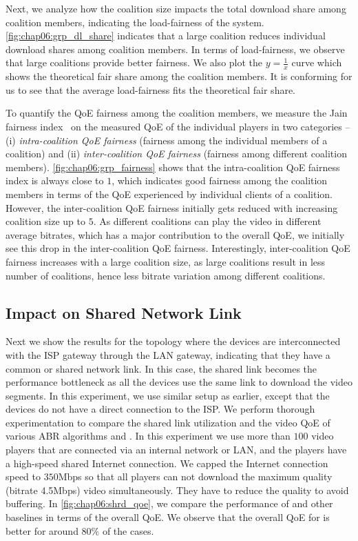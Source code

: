 Next, we analyze how the coalition size impacts the total download share among coalition members, indicating the load-fairness of the system. \fig\ref{fig:chap06:grp_dl_share} indicates that a large coalition reduces individual download shares among coalition members. In terms of load-fairness, we observe that large coalitions provide better fairness. We also plot the $y=\frac{1}{x}$ curve which shows the theoretical fair share among the coalition members. It is conforming for us to see that the average load-fairness fits the theoretical fair share. 

To quantify the \ac{QoE} fairness among the coalition members, we measure the Jain fairness index~\cite{jain1999throughput} on the measured \ac{QoE} of the individual players in two categories -- (i) \textit{intra-coalition \acs{QoE} fairness} (fairness among the individual members of a coalition) and (ii) \textit{inter-coalition \acs{QoE} fairness} (fairness among different coalition members). \fig\ref{fig:chap06:grp_fairness} shows that the intra-coalition \ac{QoE} fairness index is always close to $1$, which indicates good fairness among the coalition members in terms of the \ac{QoE} experienced by individual clients of a coalition. However, the inter-coalition \ac{QoE} fairness initially gets reduced with increasing coalition size up to $5$. As different coalitions can play the video in different average bitrates, which has a major contribution to the overall \ac{QoE}, we initially see this drop in the inter-coalition \ac{QoE} fairness. Interestingly, inter-coalition \ac{QoE} fairness increases with a large coalition size, as large coalitions result in less number of coalitions, hence less bitrate variation among different coalitions.

\subsection{Impact on Shared Network Link}
Next we show the results for the topology where the devices are interconnected with the \ac{ISP} gateway through the \ac{LAN} gateway, indicating that they have a common or shared network link. In this case, the shared link becomes the performance bottleneck as all the devices use the same link to download the video segments. In this experiment, we use similar setup as earlier, except that the devices do not have a direct connection to the \ac{ISP}. We perform thorough experimentation to compare the shared link utilization and the video \ac{QoE} of various \ac{ABR} algorithms and \our. In this experiment we use more than $100$ video players that are connected via an internal network or \ac{LAN}, and the players have a high-speed shared Internet connection. We capped the Internet connection speed to $350$Mbps so that all players can not download the maximum quality (bitrate 4.5Mbps) video simultaneously. They have to reduce the quality to avoid buffering. In \fig\ref{fig:chap06:shrd_qoe}, we compare the performance of {\our} and other baselines in terms of the overall \ac{QoE}. We observe that the overall \ac{QoE} for {\our} is better for around $80\%$ of the cases.

